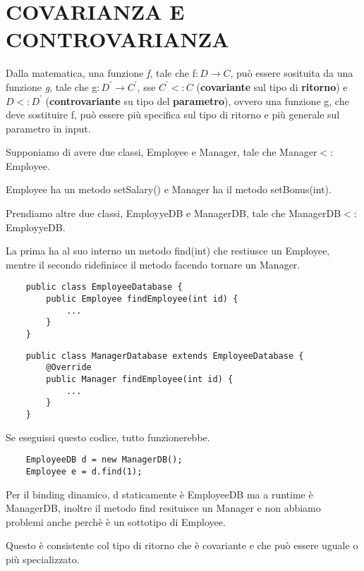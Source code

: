 \chapter{COVARIANZA E CONTROVARIANZA}

Dalla matematica, una funzione \textit{f}, tale che f$:D\rightarrow C$, può essere sosituita da una funzione \textit{g}, tale che g$:D^\prime\rightarrow C^\prime$, sse $C^\prime<:C$ 
(\textbf{covariante} sul tipo di \textbf{ritorno}) e $D<:D^\prime$ (\textbf{controvariante} su tipo del \textbf{parametro}), ovvero una funzione g, che deve 
sostituire f, può essere più specifica sul tipo di ritorno e più generale sul parametro in input.

Supponiamo di avere due classi, Employee e Manager, tale che Manager$<:$Employee.

Employee ha un metodo setSalary() e Manager ha il metodo setBonus(int).

Prendiamo altre due classi, EmployyeDB e ManagerDB, tale che ManagerDB$<:$EmployyeDB.

La prima ha al suo interno un metodo find(int) che restiusce un Employee, mentre il secondo ridefinisce il metodo facendo tornare un Manager.
\begin{multicols}{2}
    \begin{lstlisting}
    public class EmployeeDatabase {
        public Employee findEmployee(int id) {
            ...
        }
    }    
    \end{lstlisting}       
\columnbreak
    \begin{lstlisting}
    public class ManagerDatabase extends EmployeeDatabase {
        @Override
        public Manager findEmployee(int id) {
            ...
        }
    }
    \end{lstlisting}
\end{multicols}

Se eseguissi questo codice, tutto funzionerebbe.

\begin{lstlisting}
    EmployeeDB d = new ManagerDB();
    Employee e = d.find(1);
\end{lstlisting}

Per il binding dinamico, d staticamente è EmployeeDB ma a runtime è ManagerDB, inoltre il metodo find resituisce un Manager e non abbiamo problemi anche perchè è un 
sottotipo di Employee.

Questo è consistente col tipo di ritorno che è covariante e che può essere uguale o più specializzato.

